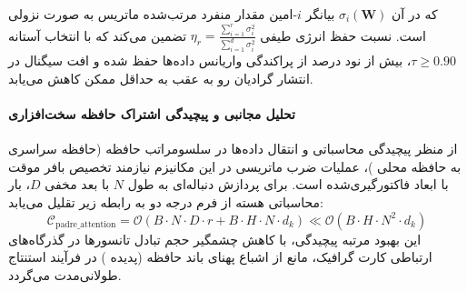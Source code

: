 که در آن $\sigma_i(\mathbf{W})$ بیانگر $i$-امین مقدار منفرد مرتب‌شده ماتریس به صورت نزولی است. نسبت حفظ انرژی طیفی $\eta_r = \frac{\sum_{i=1}^r \sigma_i^2}{\sum_{i=1}^{d} \sigma_i^2}$ تضمین می‌کند که با انتخاب آستانه $\tau \ge 0.90$، بیش از نود درصد از پراکندگی واریانس داده‌ها حفظ شده و افت سیگنال در انتشار گرادیان رو به عقب به حداقل ممکن کاهش می‌یابد.

\paragraph{تحلیل مجانبی و پیچیدگی اشتراک حافظه سخت‌افزاری}
از منظر پیچیدگی محاسباتی و انتقال داده‌ها در سلسومراتب حافظه (حافظه سراسری  به حافظه محلی )، عملیات ضرب ماتریسی در این مکانیزم نیازمند تخصیص بافر موقت با ابعاد فاکتورگیری‌شده است. برای پردازش دنباله‌ای به طول $N$ با بعد مخفی $D$، بار محاسباتی هسته از فرم درجه دو به رابطه زیر تقلیل می‌یابد:
\begin{equation}
\label{eq:complexity_padre_attention}
\mathcal{C}_{\text{padre\_attention}} = \mathcal{O}\left( B \cdot N \cdot D \cdot r + B \cdot H \cdot N \cdot d_k \right) \ll \mathcal{O}\left( B \cdot H \cdot N^2 \cdot d_k \right)
\end{equation}
این بهبود مرتبه پیچیدگی، با کاهش چشمگیر حجم تبادل تانسورها در گذرگاه‌های ارتباطی کارت گرافیک، مانع از اشباع پهنای باند حافظه (پدیده ) در فرآیند استنتاج طولانی‌مدت می‌گردد.
